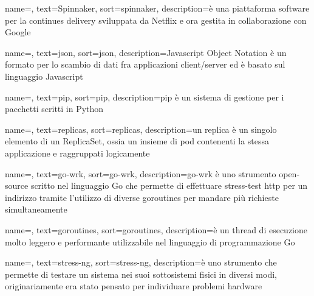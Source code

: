 {
    name=,
    text=Spinnaker,
    sort=spinnaker,
    description={è una piattaforma software per la continues delivery sviluppata da Netflix e ora gestita in collaborazione con Google}
}

{
    name=,
    text=json,
    sort=json,
    description={Javascript Object Notation è un formato per lo scambio di dati fra applicazioni client/server ed è basato sul linguaggio Javascript}
}

{
    name=,
    text=pip,
    sort=pip,
    description={pip è un sistema di gestione per i pacchetti scritti in Python}
}

{
    name=,
    text=replicas,
    sort=replicas,
    description={un replica è un singolo elemento di un ReplicaSet, ossia un insieme di pod contenenti la stessa applicazione e raggruppati logicamente}
}

{
    name=,
    text=go-wrk,
    sort=go-wrk,
    description={go-wrk è uno strumento open-source scritto nel linguaggio Go che permette di effettuare stress-test http per un indirizzo tramite l'utilizzo di diverse goroutines per mandare più richieste simultaneamente}
}

{
    name=,
    text=goroutines,
    sort=goroutines,
    description={è un thread di esecuzione molto leggero e performante utilizzabile nel linguaggio di programmazione Go}
}

{
    name=,
    text=stress-ng,
    sort=stress-ng,
    description={è uno strumento che permette di testare un sistema nei suoi sottosistemi fisici in diversi modi, originariamente era stato pensato per individuare problemi hardware}
}